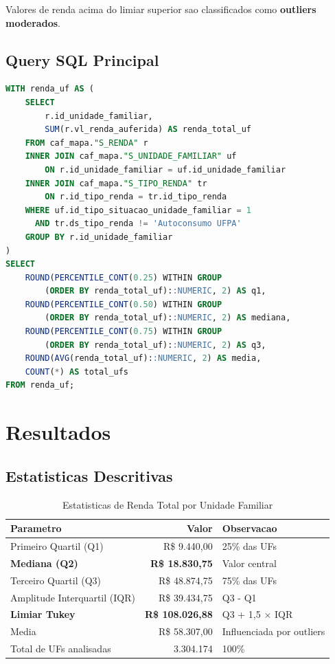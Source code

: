 \documentclass[11pt,a4paper]{article}
\begin{document}
Valores de renda acima do limiar superior sao classificados como \textbf{outliers moderados}.

\subsection{Query SQL Principal}

\begin{lstlisting}[language=SQL, caption={Calculo de estatisticas de renda por UF}]
WITH renda_uf AS (
    SELECT
        r.id_unidade_familiar,
        SUM(r.vl_renda_auferida) AS renda_total_uf
    FROM caf_mapa."S_RENDA" r
    INNER JOIN caf_mapa."S_UNIDADE_FAMILIAR" uf
        ON r.id_unidade_familiar = uf.id_unidade_familiar
    INNER JOIN caf_mapa."S_TIPO_RENDA" tr
        ON r.id_tipo_renda = tr.id_tipo_renda
    WHERE uf.id_tipo_situacao_unidade_familiar = 1
      AND tr.ds_tipo_renda != 'Autoconsumo UFPA'
    GROUP BY r.id_unidade_familiar
)
SELECT
    ROUND(PERCENTILE_CONT(0.25) WITHIN GROUP
        (ORDER BY renda_total_uf)::NUMERIC, 2) AS q1,
    ROUND(PERCENTILE_CONT(0.50) WITHIN GROUP
        (ORDER BY renda_total_uf)::NUMERIC, 2) AS mediana,
    ROUND(PERCENTILE_CONT(0.75) WITHIN GROUP
        (ORDER BY renda_total_uf)::NUMERIC, 2) AS q3,
    ROUND(AVG(renda_total_uf)::NUMERIC, 2) AS media,
    COUNT(*) AS total_ufs
FROM renda_uf;
\end{lstlisting}

\section{Resultados}

\subsection{Estatisticas Descritivas}

\begin{table}[H]
\centering
\caption{Estatisticas de Renda Total por Unidade Familiar}
\label{tab:estatisticas}
\begin{tabular}{lrl}
\toprule
\textbf{Parametro} & \textbf{Valor} & \textbf{Observacao} \\
\midrule
Primeiro Quartil (Q1) & R\$ 9.440,00 & 25\% das UFs \\
\textbf{Mediana (Q2)} & \textbf{R\$ 18.830,75} & Valor central \\
Terceiro Quartil (Q3) & R\$ 48.874,75 & 75\% das UFs \\
\midrule
Amplitude Interquartil (IQR) & R\$ 39.434,75 & Q3 - Q1 \\
\textbf{Limiar Tukey} & \textbf{R\$ 108.026,88} & Q3 + 1,5 $\times$ IQR \\
\midrule
Media & R\$ 58.307,00 & Influenciada por outliers \\
Total de UFs analisadas & 3.304.174 & 100\% \\
\bottomrule
\end{tabular}
\end{table}
\end{document}
